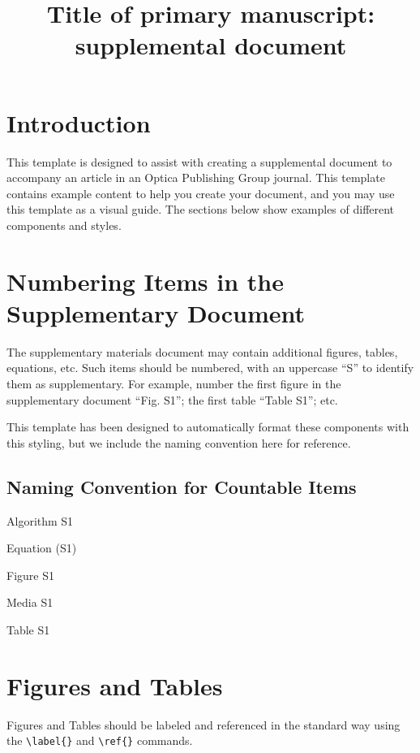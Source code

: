 \documentclass[9pt]{osa-supplemental-document}
\title{Title of primary manuscript: supplemental document}
\author{ \orcidlink{0009-0008-0539-1289}} %
\begin{document}
\maketitle

\section{Introduction}

This template is designed to assist with creating a supplemental document to accompany an article in an Optica Publishing Group journal. This template contains example content to help you create your document, and you may use this template as a visual guide. The sections below show examples of different components and styles.


\section{Numbering Items in the Supplementary Document}

The supplementary materials document may contain additional figures, tables, equations, etc. Such items should be numbered, with an uppercase “S” to identify them as supplementary. For example, number the first figure in the supplementary document “Fig. S1”; the first table “Table S1”; etc.

This template has been designed to automatically format these components with this styling, but we include the naming convention here for reference.

\subsection*{Naming Convention for Countable Items}

\begin{condenseditemize}
\item[] Algorithm S1
\item[] Equation (S1)
\item[] Figure S1
\item[] Media S1
\item[] Table S1
\end{condenseditemize}


\section{Figures and Tables}
Figures and Tables should be labeled and referenced in the standard way using the \verb|\label{}| and \verb|\ref{}| commands.
\end{document}
